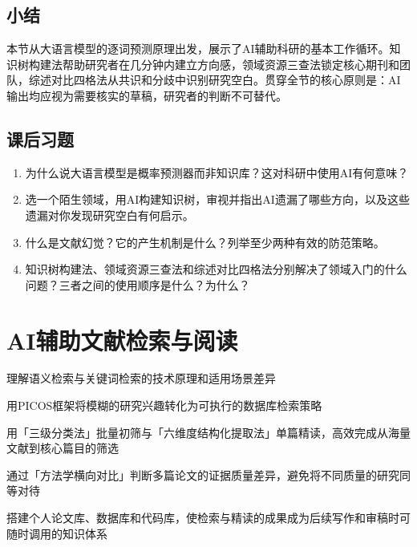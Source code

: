 \medskip
\subsection*{小结}
本节从大语言模型的逐词预测原理出发，展示了AI辅助科研的基本工作循环。知识树构建法帮助研究者在几分钟内建立方向感，领域资源三查法锁定核心期刊和团队，综述对比四格法从共识和分歧中识别研究空白。贯穿全节的核心原则是：AI输出均应视为需要核实的草稿，研究者的判断不可替代。

\bigskip
\subsection*{课后习题}
\begin{enumerate}
\setlength{\itemsep}{6pt}

\item 为什么说大语言模型是概率预测器而非知识库？这对科研中使用AI有何意味？

\item 选一个陌生领域，用AI构建知识树，审视并指出AI遗漏了哪些方向，以及这些遗漏对你发现研究空白有何启示。

\item 什么是文献幻觉？它的产生机制是什么？列举至少两种有效的防范策略。

\item 知识树构建法、领域资源三查法和综述对比四格法分别解决了领域入门的什么问题？三者之间的使用顺序是什么？为什么？

\end{enumerate}
\newpage

\section{AI辅助文献检索与阅读}
\label{sec:5.2}

\begin{sectionkeypoints}
\item 理解语义检索与关键词检索的技术原理和适用场景差异
\item 用PICOS框架将模糊的研究兴趣转化为可执行的数据库检索策略
\item 用「三级分类法」批量初筛与「六维度结构化提取法」单篇精读，高效完成从海量文献到核心篇目的筛选
\item 通过「方法学横向对比」判断多篇论文的证据质量差异，避免将不同质量的研究同等对待
\item 搭建个人论文库、数据库和代码库，使检索与精读的成果成为后续写作和审稿时可随时调用的知识体系
\end{sectionkeypoints}


